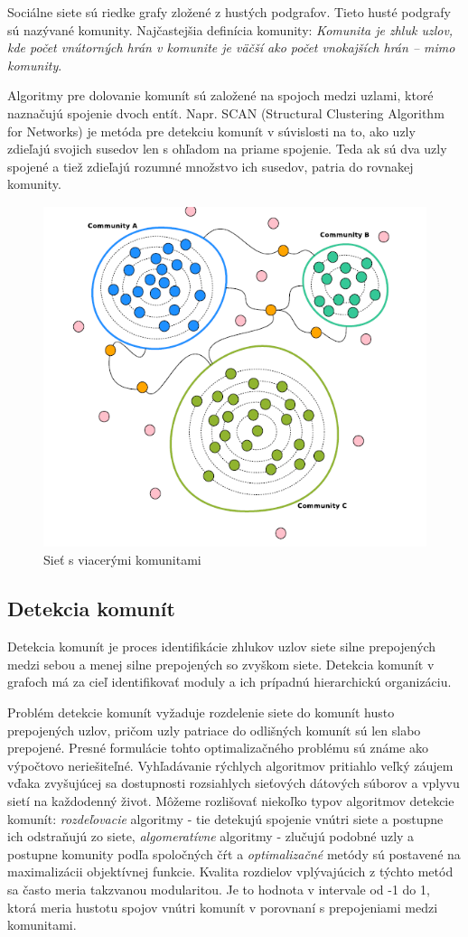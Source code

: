 \documentclass[slovak,master,public,dept460,male,cpdeclaration,oneside]{diploma}
\begin{document}
Sociálne siete sú riedke grafy zložené z hustých podgrafov. Tieto husté podgrafy sú nazývané
komunity. Najčastejšia definícia komunity: \textit{Komunita je zhluk uzlov, kde počet vnútorných hrán v komunite je väčší ako počet vnokajších hrán – mimo komunity}. \cite{8}

Algoritmy pre dolovanie komunít sú založené na spojoch medzi uzlami, ktoré naznačujú
spojenie dvoch entít. Napr. SCAN (Structural Clustering Algorithm for Networks) je metóda
pre detekciu komunít v súvislosti na to, ako uzly zdieľajú svojich susedov len s ohľadom na
priame spojenie. Teda ak sú dva uzly spojené a tiež zdieľajú rozumné množstvo ich susedov,
patria do rovnakej komunity.


\begin{figure}[H]
\centering
\includegraphics[width=12cm,height=10cm]{figures/comunities}
\caption{Sieť s viacerými komunitami}
\end{figure}


\subsection{Detekcia komunít}
Detekcia komunít je proces identifikácie zhlukov uzlov siete silne prepojených medzi sebou a menej silne prepojených so zvyškom siete. Detekcia komunít v grafoch má za cieľ identifikovať moduly a ich prípadnú hierarchickú organizáciu.


Problém detekcie komunít vyžaduje  rozdelenie siete do komunít husto prepojených uzlov, pričom uzly patriace do odlišných komunít sú len slabo prepojené. Presné formulácie tohto optimalizačného problému sú známe ako výpočtovo neriešiteľné. Vyhľadávanie rýchlych algoritmov pritiahlo veľký záujem vďaka zvyšujúcej sa dostupnosti rozsiahlych sieťových dátových súborov a vplyvu sietí na každodenný život. Môžeme rozlišovať niekoľko typov algoritmov detekcie komunít: \textit{rozdeľovacie} algoritmy - tie detekujú spojenie vnútri siete a postupne ich odstraňujú zo siete, \textit{algomeratívne} algoritmy - zlučujú podobné uzly a postupne komunity podľa spoločných čŕt a \textit{optimalizačné} metódy sú postavené na maximalizácii objektívnej funkcie. Kvalita rozdielov vplývajúcich z týchto metód sa často meria takzvanou modularitou. Je to hodnota v intervale od -1 do 1, ktorá meria hustotu spojov vnútri komunít v porovnaní s prepojeniami medzi komunitami. 
\end{document}
